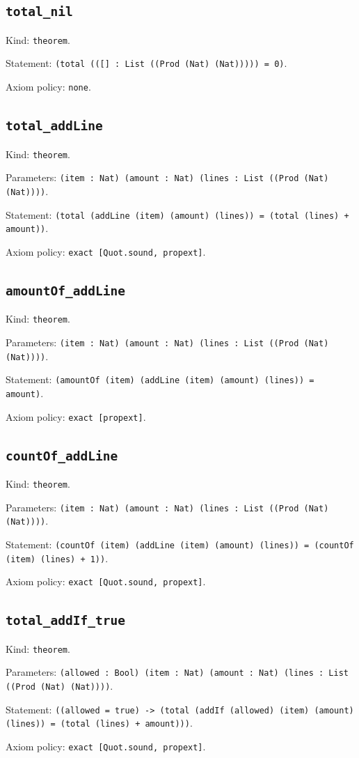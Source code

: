 \documentclass[11pt]{article}
\begin{document}
\subsection*{\texttt{total\_nil}}
\noindent Kind: \texttt{theorem}.\par
\noindent Statement: \texttt{(total (([] : List ((Prod (Nat) (Nat))))) = 0)}.\par
\noindent Axiom policy: \texttt{none}.\par
\subsection*{\texttt{total\_addLine}}
\noindent Kind: \texttt{theorem}.\par
\noindent Parameters: \texttt{(item : Nat) (amount : Nat) (lines : List ((Prod (Nat) (Nat))))}.\par
\noindent Statement: \texttt{(total (addLine (item) (amount) (lines)) = (total (lines) + amount))}.\par
\noindent Axiom policy: \texttt{exact [Quot.sound, propext]}.\par
\subsection*{\texttt{amountOf\_addLine}}
\noindent Kind: \texttt{theorem}.\par
\noindent Parameters: \texttt{(item : Nat) (amount : Nat) (lines : List ((Prod (Nat) (Nat))))}.\par
\noindent Statement: \texttt{(amountOf (item) (addLine (item) (amount) (lines)) = amount)}.\par
\noindent Axiom policy: \texttt{exact [propext]}.\par
\subsection*{\texttt{countOf\_addLine}}
\noindent Kind: \texttt{theorem}.\par
\noindent Parameters: \texttt{(item : Nat) (amount : Nat) (lines : List ((Prod (Nat) (Nat))))}.\par
\noindent Statement: \texttt{(countOf (item) (addLine (item) (amount) (lines)) = (countOf (item) (lines) + 1))}.\par
\noindent Axiom policy: \texttt{exact [Quot.sound, propext]}.\par
\subsection*{\texttt{total\_addIf\_true}}
\noindent Kind: \texttt{theorem}.\par
\noindent Parameters: \texttt{(allowed : Bool) (item : Nat) (amount : Nat) (lines : List ((Prod (Nat) (Nat))))}.\par
\noindent Statement: \texttt{((allowed = true) -> (total (addIf (allowed) (item) (amount) (lines)) = (total (lines) + amount)))}.\par
\noindent Axiom policy: \texttt{exact [Quot.sound, propext]}.\par
\end{document}
